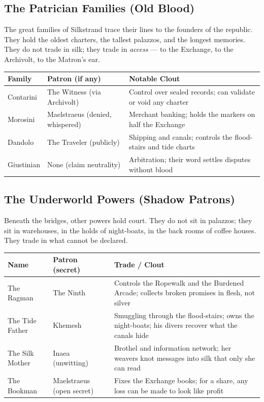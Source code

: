 \subsection*{The Patrician Families (Old Blood)}
\label{sec:silkstrand-patricians}

The great families of Silkstrand trace their lines to the founders of the republic. They hold the oldest charters, the tallest palazzos, and the longest memories. They do not trade in silk; they trade in \emph{access} --- to the Exchange, to the Archivolt, to the Matron's ear.

\begin{longtable}{|p{}|p{}|p{}|}
\hline
\textbf{Family} & \textbf{Patron (if any)} & \textbf{Notable Clout} \\
\hline
Contarini & The Witness (via Archivolt) & Control over sealed records; can validate or void any charter \\
\hline
Morosini & Maelstraeus (denied, whispered) & Merchant banking; holds the markers on half the Exchange \\
\hline
Dandolo & The Traveler (publicly) & Shipping and canals; controls the flood-stairs and tide charts \\
\hline
Giustinian & None (claim neutrality) & Arbitration; their word settles disputes without blood \\
\hline
\end{longtable}

\subsection*{The Underworld Powers (Shadow Patrons)}
\label{sec:silkstrand-underworld}

Beneath the bridges, other powers hold court. They do not sit in palazzos; they sit in warehouses, in the holds of night-boats, in the back rooms of coffee houses. They trade in what cannot be declared.

\begin{longtable}{|p{}|p{}|p{}|}
\hline
\textbf{Name} & \textbf{Patron (secret)} & \textbf{Trade / Clout} \\
\hline
The Ragman & The Ninth & Controls the Ropewalk and the Burdened Arcade; collects broken promises in flesh, not silver \\
\hline
The Tide Father & Khemesh & Smuggling through the flood-stairs; owns the night-boats; his divers recover what the canals hide \\
\hline
The Silk Mother & Inaea (unwitting) & Brothel and information network; her weavers knot messages into silk that only she can read \\
\hline
The Bookman & Maelstraeus (open secret) & Fixes the Exchange books; for a share, any loss can be made to look like profit \\
\hline
\end{longtable}

